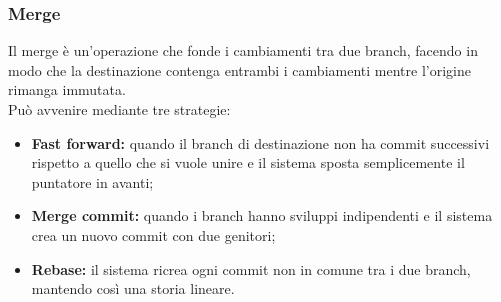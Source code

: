 \documentclass[12pt]{article}
\begin{document}
    \subsubsection{Merge}
    Il merge è un'operazione che fonde i cambiamenti tra due branch, facendo in modo che la destinazione contenga entrambi i cambiamenti mentre l'origine rimanga immutata.\\
    Può avvenire mediante tre strategie:
    \begin{itemize}
      \item \textbf{Fast forward:} quando il branch di destinazione non ha commit successivi rispetto a quello che si vuole unire e il sistema sposta semplicemente il puntatore in avanti;
      \item \textbf{Merge commit:} quando i branch hanno sviluppi indipendenti e il sistema crea un nuovo commit con due genitori;
      \item \textbf{Rebase:} il sistema ricrea ogni commit non in comune tra i due branch, mantendo così una storia lineare.
    \end{itemize}
  
\end{document}
